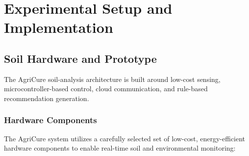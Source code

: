 \documentclass[conference]{IEEEtran}
\begin{document}
\section{Experimental Setup and Implementation}

\subsection{Soil Hardware and Prototype}
The AgriCure soil-analysis architecture is built around low-cost sensing, microcontroller-based control, cloud communication, and rule-based recommendation generation.

\subsubsection{Hardware Components}
The AgriCure system utilizes a carefully selected set of low-cost, energy-efficient hardware components to enable real-time soil and environmental monitoring:
\end{document}
